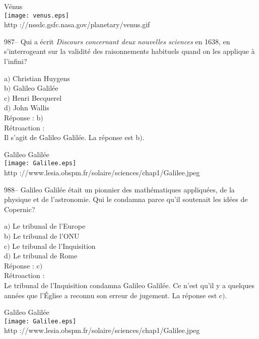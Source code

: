 ﻿\documentclass[letterpaper, 12pt]{article}
\begin{document}
        \begin{center}
        V\'enus\\
    \texttt{[image: venus.eps]}\\
        {\footnotesize http ://nssdc.gsfc.nasa.gov/planetary/venus.gif}
    \end{center}

987-- Qui a \'ecrit {\sl Discours concernant deux nouvelles
sciences} en 1638, en s'interrogeant sur la validit\'e des
raisonnements habituels quand on les applique \`a l'infini?

a$)$ Christian Huygens \\
b$)$ Galileo Galil\'ee \\
c$)$ Henri Becquerel \\
d$)$ John Wallis\\

R\'eponse : b$)$\\

R\'etroaction :\\
Il s'agit de Galileo Galil\'ee. La r\'eponse est b$)$.

        \begin{center}
        Galileo Galil\'ee\\
    \texttt{[image: Galilee.eps]}\\
        {\footnotesize http
://www.lesia.obspm.fr/solaire/sciences/chap1/Galilee.jpeg}
    \end{center}

988-- Galileo Galil\'ee \'etait un pionnier des math\'ematiques
appliqu\'ees, de la physique et de l'astronomie. Qui le condamna
parce qu'il soutenait les id\'ees de Copernic?

a$)$ Le tribunal de l'Europe \\
b$)$ Le tribunal de l'ONU \\
c$)$ Le tribunal de l'Inquisition \\
d$)$ Le tribunal de Rome\\

R\'eponse : c$)$\\

R\'etroaction : \\
Le tribunal de l'Inquisition condamna Galileo Galil\'ee. Ce n'est
qu'il y a quelques ann\'ees que l'\'Eglise a reconnu son erreur de
jugement.
La r\'eponse est c$)$.\\

        \begin{center}
        Galileo Galil\'ee\\
    \texttt{[image: Galilee.eps]}\\
        {\footnotesize http
://www.lesia.obspm.fr/solaire/sciences/chap1/Galilee.jpeg}
    \end{center}
\end{document}
